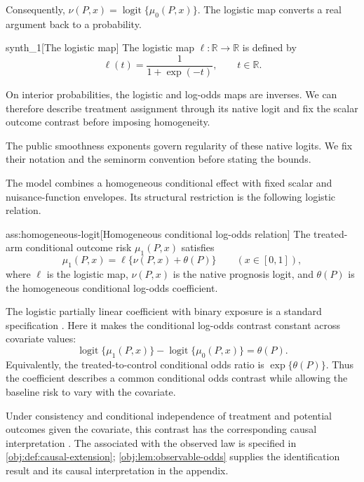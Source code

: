 Consequently, \(\nu(P,x)=\operatorname{logit}\{\mu_0(P,x)\}\). The logistic map  converts a real argument  back to a probability.

\begin{definitionv}{synth_1}[The logistic map]
The logistic map \(\ell:\mathbb R\to\mathbb R\) is defined by
\[
\ell(t)=\frac{1}{1+\exp(-t)},\qquad t\in\mathbb R.
\]
\end{definitionv}

On interior probabilities, the logistic and log-odds maps are inverses. We can therefore describe treatment assignment through its native logit and fix the scalar outcome contrast before imposing homogeneity.



The public smoothness exponents govern regularity of these native logits. We fix their notation and the seminorm convention before stating the bounds.



The model combines a homogeneous conditional effect with fixed scalar and nuisance-function envelopes. Its structural restriction is the following logistic relation.

\begin{assumptionv}{ass:homogeneous-logit}[Homogeneous conditional log-odds relation]
The treated-arm conditional outcome risk \(\mu_1(P,x)\) satisfies
\[
\mu_1(P,x)=\ell\{\nu(P,x)+\theta(P)\}
\qquad (x\in[0,1]),
\]
where \(\ell\) is the logistic map, \(\nu(P,x)\) is the native prognosis logit, and \(\theta(P)\) is the homogeneous conditional log-odds coefficient.
\end{assumptionv}

The logistic partially linear coefficient with binary exposure is a standard specification \citep{Tan2019LogisticDR}. Here it makes the conditional log-odds contrast constant across covariate values:
\[
\operatorname{logit}\{\mu_1(P,x)\}
-
\operatorname{logit}\{\mu_0(P,x)\}
=\theta(P).
\]
Equivalently, the treated-to-control conditional odds ratio is \(\exp\{\theta(P)\}\). Thus the coefficient describes a common conditional odds contrast while allowing the baseline risk to vary with the covariate.

Under consistency and conditional independence of treatment and potential outcomes given the covariate, this contrast has the corresponding causal interpretation \citep{Rubin1974,Rosenbaum1983}. The  associated with the observed law is specified in \cref{obj:def:causal-extension}; \cref{obj:lem:observable-odds} supplies the identification result and its causal interpretation in the appendix.

